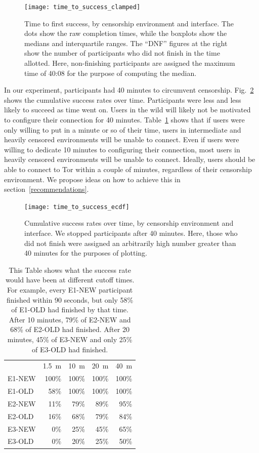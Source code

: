 \documentclass[USenglish,oneside,twocolumn]{article}
\begin{document}
\begin{figure}
\centering
\texttt{[image: time\_to\_success\_clamped]}
\caption{
Time to first success, by censorship environment and interface.
The dots show the raw completion times,
while the boxplots show the medians and interquartile ranges.
The ``DNF'' figures at the right show the number of participants 
who did not finish in the time allotted.
Here, non-finishing participants are assigned the maximum time of 40:08
for the purpose of computing the median.
}
\label{fig:time_to_success_clamped}
\end{figure}

In our experiment, participants had 40 minutes to circumvent censorship. Fig.~\ref{fig:time_to_success_ecdf} shows the cumulative success rates over time. Participants were less and less likely to succeed as time went on. Users in the wild will likely not be motivated to configure their connection for 40 minutes. Table~\ref{table:less_time} shows that if users were only willing to put in a minute or so of their time, users in intermediate and heavily censored environments will be unable to connect. Even if users were willing to dedicate 10 minutes to configuring their connection, most users in heavily censored environments will be unable to connect. Ideally, users should be able to connect to Tor within a couple of minutes, regardless of their censorship environment. We propose ideas on how to achieve this in section~\ref{recommendations}. 

\begin{figure}
\centering
\texttt{[image: time\_to\_success\_ecdf]}
\caption{
Cumulative success rates over time, by censorship environment and interface.
We stopped participants after 40 minutes. Here, those who did not finish were assigned
an arbitrarily high number greater than 40 minutes for the purposes of plotting. 
}
\label{fig:time_to_success_ecdf}
\end{figure}

\begin{table}
\centering 
	\begin{tabular}{l r r r r}
	& \multicolumn{1}{c}{1.5~m} & \multicolumn{1}{c}{10~m} & \multicolumn{1}{c}{20~m} & \multicolumn{1}{c}{40~m} \\
	\noalign{\hrule}
	E1-NEW & 100\% & 100\% & 100\% & 100\% \\
	E1-OLD & 58\% & 100\% & 100\% & 100\% \\
	E2-NEW & 11\% & 79\% & 89\% & 95\% \\
	E2-OLD & 16\% & 68\% & 79\% & 84\% \\
	E3-NEW & 0\% & 25\% & 45\% & 65\% \\
	E3-OLD & 0\% & 20\% & 25\% & 50\% \\
	\end{tabular}
\caption{This Table shows what the success rate would have been
at different cutoff times.
For example, every E1-NEW participant finished within 90 seconds,
but only 58\% of E1-OLD had finished by that time.
After 10 minutes, 79\% of E2-NEW and 68\% of E2-OLD had finished.
After 20 minutes, 45\% of E3-NEW and only 25\% of E3-OLD had finished.}
\label{table:less_time}
\end{table}
\end{document}
